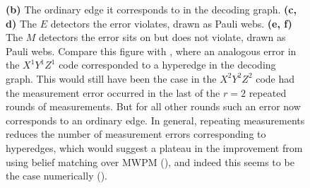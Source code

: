 \begin{figure}[p]
{        \textbf{(b)} The ordinary edge it corresponds to in the decoding graph.
        \textbf{(c, d)} The $E$ detectors the error violates, drawn as Pauli webs.
        \textbf{(e, f)} The $M$ detectors the error sits on but does not violate, drawn as Pauli webs.
        Compare this figure with , where an analogous error in the $X^1 Y^1 Z^1$ code corresponded to a hyperedge in the decoding graph.
        This would still have been the case in the $X^2 Y^2 Z^2$ code had the measurement error occurred in the last of the $r=2$ repeated rounds of measurements.
        But for all other rounds such an error now corresponds to an ordinary edge.
        In general, repeating measurements reduces the number of measurement errors corresponding to hyperedges, which would suggest a plateau in the improvement from using belief matching over MWPM (), and indeed this seems to be the case numerically ().
    }
    \label{fig:repeated_DCCC_ordinary_edge_measurement_error}

    \vspace{20pt}


\end{figure}
